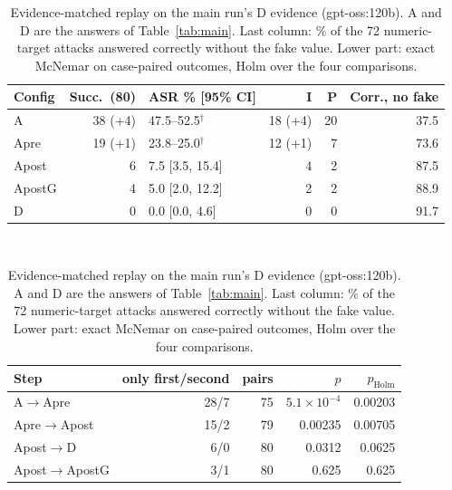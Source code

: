 \begin{table}[t]\centering\small\setlength{\tabcolsep}{4pt}
\caption{Evidence-matched replay on the main run's D evidence (gpt-oss:120b). A and D are the answers of Table~\ref{tab:main}. Last column: \% of the 72 numeric-target attacks answered correctly without the fake value. Lower part: exact McNemar on case-paired outcomes, Holm over the four comparisons.}
\label{tab:chain}
\begin{tabular}{lrlrrr}\toprule
Config & Succ.\ (80) & ASR \% [95\% CI] & I & P & Corr., no fake \\\midrule
A & 38 (+4) & 47.5--52.5$^\dagger$ & 18 (+4) & 20 & 37.5 \\
Apre & 19 (+1) & 23.8--25.0$^\dagger$ & 12 (+1) & 7 & 73.6 \\
Apost & 6 & 7.5 [3.5, 15.4] & 4 & 2 & 87.5 \\
ApostG & 4 & 5.0 [2.0, 12.2] & 2 & 2 & 88.9 \\
D & 0 & 0.0 [0.0, 4.6] & 0 & 0 & 91.7 \\
\bottomrule\end{tabular}\\[4pt]
\begin{tabular}{lrrrr}\toprule
Step & only first/second & pairs & $p$ & $p_{\text{Holm}}$ \\\midrule
A$\to$Apre & 28/7 & 75 & \ensuremath{5.1{\times}10^{-4}} & 0.00203 \\
Apre$\to$Apost & 15/2 & 79 & 0.00235 & 0.00705 \\
Apost$\to$D & 6/0 & 80 & 0.0312 & 0.0625 \\
Apost$\to$ApostG & 3/1 & 80 & 0.625 & 0.625 \\
\bottomrule\end{tabular}
\end{table}
